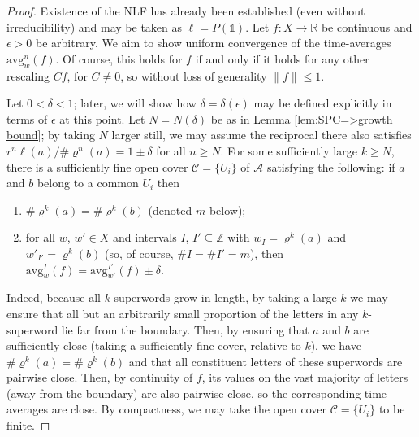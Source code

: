 \documentclass[11pt]{amsart}
\numberwithin{equation}{section}
\theoremstyle{plain}
\theoremstyle{definition}
\newcommand{\Z}{{\mathbb Z}}
\newcommand{\R}{{\mathbb R}}
\newcommand{\mc}{\mathcal}
\newcommand{\A}{\mc A}
\newcommand{\sub}{\varrho}
\newcommand{\bbo}{\mathds{1}} %
\newcommand{\avg}{\mathrm{avg}}
\begin{document}
\begin{proof}
Existence of the NLF has already been established (even without irreducibility) and may be taken as \(\ell = P(\bbo)\). Let \(f \colon X \to \R\) be continuous and \(\epsilon > 0\) be arbitrary. We aim to show uniform convergence of the time-averages \(\avg^n_w(f)\). Of course, this holds for \(f\) if and only if it holds for any other rescaling \(Cf\), for \(C \neq 0\), so without loss of generality \(\|f\| \leq 1\).

Let \(0 < \delta < 1\); later, we will show how \(\delta = \delta(\epsilon)\) may be defined explicitly in terms of \(\epsilon\) at this point. Let \(N = N(\delta)\) be as in Lemma \ref{lem:SPC=>growth bound}; by taking \(N\) larger still, we may assume the reciprocal there also satisfies \(r^n \ell(a) / \# \sub^n(a) = 1 \pm \delta\) for all \(n \geq N\). For some sufficiently large \(k \geq N\), there is a sufficiently fine open cover \(\mathscr{C} = \{U_i\}\) of \(\A\) satisfying the following: if \(a\) and \(b\) belong to a common \(U_i\) then
\begin{enumerate}
	\item \(\# \sub^k(a) = \# \sub^k(b)\) (denoted \(m\) below);
	\item for all \(w\), \(w' \in X\) and intervals \(I\), \(I' \subseteq \Z\) with \(w_I = \sub^k(a)\) and \(w'_{I'} = \sub^k(b)\) (so, of course, \(\#I = \#I' = m\)), then \( \avg_w^I(f) = \avg_{w'}^{I'}(f) \pm \delta\).
\end{enumerate}
Indeed, because all \(k\)-superwords grow in length, by taking a large \(k\) we may ensure that all but an arbitrarily small proportion of the letters in any \(k\)-superword lie far from the boundary. Then, by ensuring that \(a\) and \(b\) are sufficiently close (taking a sufficiently fine cover, relative to \(k\)), we have \(\# \sub^k(a) = \# \sub^k(b)\) and that all constituent letters of these superwords are pairwise close. Then, by continuity of \(f\), its values on the vast majority of letters (away from the boundary) are also pairwise close, so the corresponding time-averages are close. By compactness, we may take the open cover \(\mathscr{C} = \{U_i\}\) to be finite.


\end{proof}
\end{document}
